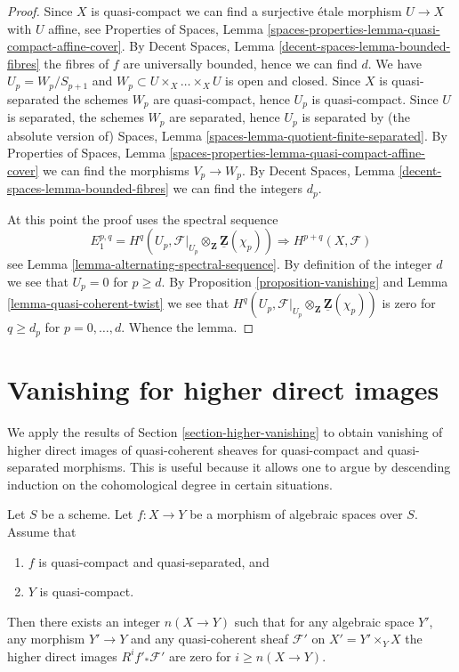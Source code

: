 \begin{proof}
Since $X$ is quasi-compact we can find a surjective \'etale morphism
$U \to X$ with $U$ affine, see
Properties of Spaces, Lemma
\ref{spaces-properties-lemma-quasi-compact-affine-cover}.
By
Decent Spaces, Lemma \ref{decent-spaces-lemma-bounded-fibres}
the fibres of $f$ are universally bounded, hence we can find $d$.
We have $U_p = W_p/S_{p + 1}$ and $W_p \subset U \times_X \ldots \times_X U$
is open and closed. Since $X$ is quasi-separated the schemes
$W_p$ are quasi-compact, hence $U_p$ is quasi-compact.
Since $U$ is separated, the schemes $W_p$ are separated, hence
$U_p$ is separated by (the absolute version of)
Spaces, Lemma \ref{spaces-lemma-quotient-finite-separated}.
By
Properties of Spaces, Lemma
\ref{spaces-properties-lemma-quasi-compact-affine-cover}
we can find the morphisms $V_p \to W_p$.
By
Decent Spaces, Lemma \ref{decent-spaces-lemma-bounded-fibres}
we can find the integers $d_p$.

\medskip\noindent
At this point the proof uses the spectral sequence
$$
E_1^{p, q} =
H^q(U_p, \mathcal{F}|_{U_p} \otimes_\mathbf{Z} \underline{\mathbf{Z}}(\chi_p))
\Rightarrow
H^{p + q}(X, \mathcal{F})
$$
see
Lemma \ref{lemma-alternating-spectral-sequence}.
By definition of the integer $d$ we see that $U_p = 0$ for $p \geq d$.
By Proposition \ref{proposition-vanishing}
and
Lemma \ref{lemma-quasi-coherent-twist}
we see that
$H^q(U_p,
\mathcal{F}|_{U_p} \otimes_\mathbf{Z} \underline{\mathbf{Z}}(\chi_p))$
is zero for $q \geq d_p$ for $p = 0, \ldots, d$.
Whence the lemma.
\end{proof}









\section{Vanishing for higher direct images}
\label{section-vanishing-higher-direct-images}

\noindent
We apply the results of
Section \ref{section-higher-vanishing}
to obtain vanishing of higher direct images of quasi-coherent sheaves
for quasi-compact and quasi-separated morphisms. This is useful because
it allows one to argue by descending induction on the cohomological degree
in certain situations.

\begin{lemma}
\label{lemma-vanishing-higher-direct-images}
Let $S$ be a scheme. Let $f : X \to Y$ be a
morphism of algebraic spaces over $S$.
Assume that
\begin{enumerate}
\item $f$ is quasi-compact and quasi-separated, and
\item $Y$ is quasi-compact.
\end{enumerate}
Then there exists an integer $n(X \to Y)$ such that
for any algebraic space $Y'$, any morphism $Y' \to Y$
and any quasi-coherent sheaf $\mathcal{F}'$ on $X' = Y' \times_Y X$
the higher direct images $R^if'_*\mathcal{F}'$ are zero for
$i \geq n(X \to Y)$.
\end{lemma}

